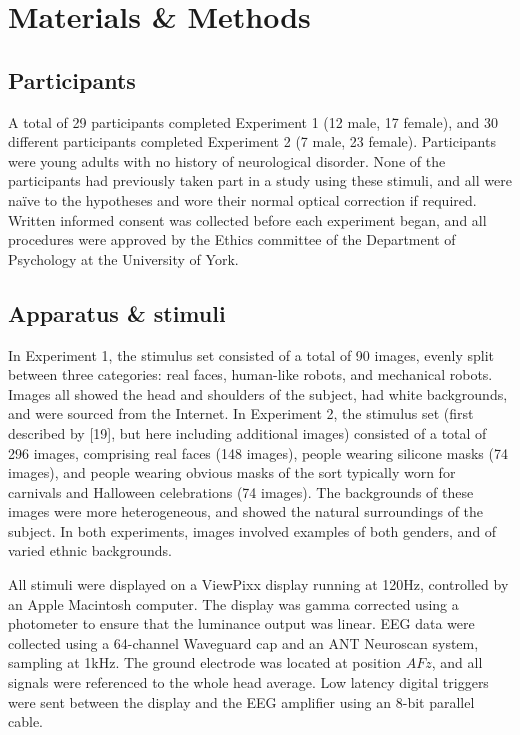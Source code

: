 \documentclass[
]{article}
\begin{document}
\section{Materials \& Methods}\label{materials-methods}

\subsection{Participants}\label{participants}

A total of 29 participants completed Experiment 1 (12 male, 17 female), and 30 different participants completed Experiment 2 (7 male, 23 female). Participants were young adults with no history of neurological disorder. None of the participants had previously taken part in a study using these stimuli, and all were naïve to the hypotheses and wore their normal optical correction if required. Written informed consent was collected before each experiment began, and all procedures were approved by the Ethics committee of the Department of Psychology at the University of York.

\subsection{Apparatus \& stimuli}\label{apparatus-stimuli}

In Experiment 1, the stimulus set consisted of a total of 90 images, evenly split between three categories: real faces, human-like robots, and mechanical robots. Images all showed the head and shoulders of the subject, had white backgrounds, and were sourced from the Internet. In Experiment 2, the stimulus set (first described by {[}19{]}, but here including additional images) consisted of a total of 296 images, comprising real faces (148 images), people wearing silicone masks (74 images), and people wearing obvious masks of the sort typically worn for carnivals and Halloween celebrations (74 images). The backgrounds of these images were more heterogeneous, and showed the natural surroundings of the subject. In both experiments, images involved examples of both genders, and of varied ethnic backgrounds.

All stimuli were displayed on a ViewPixx display running at 120Hz, controlled by an Apple Macintosh computer. The display was gamma corrected using a photometer to ensure that the luminance output was linear. EEG data were collected using a 64-channel Waveguard cap and an ANT Neuroscan system, sampling at 1kHz. The ground electrode was located at position \(AFz\), and all signals were referenced to the whole head average. Low latency digital triggers were sent between the display and the EEG amplifier using an 8-bit parallel cable.
\end{document}

